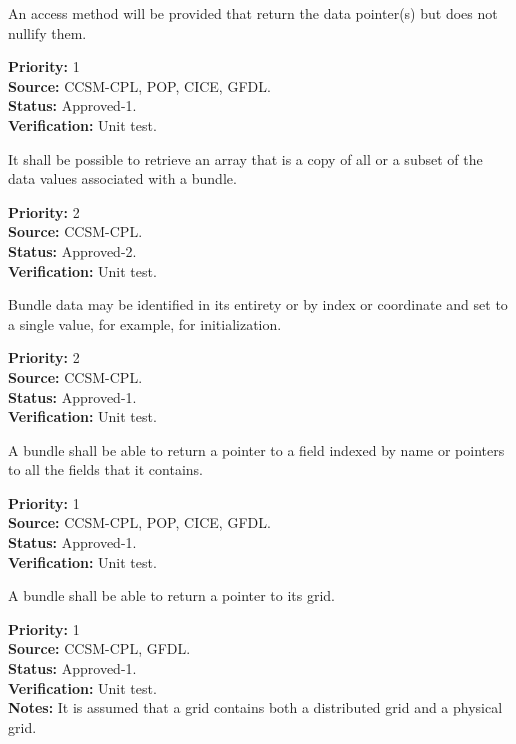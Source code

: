 An access method will be provided that return the data pointer(s) but does
not nullify them.
\begin{reqlist}
{\bf Priority:} 1\\
{\bf Source:} CCSM-CPL, POP, CICE, GFDL. \\ 
{\bf Status:} Approved-1. \\
{\bf Verification:} Unit test. 
\end{reqlist}

It shall be possible to retrieve an array that is a copy of all or
a subset of the data values associated with a bundle.
\begin{reqlist}
{\bf Priority:} 2 \\
{\bf Source:} CCSM-CPL. \\
{\bf Status:} Approved-2. \\
{\bf Verification:} Unit test. 
\end{reqlist}

Bundle data may be identified in its entirety or by index or coordinate and
set to a single value, for example, for initialization.
\begin{reqlist}
{\bf Priority:} 2 \\
{\bf Source:} CCSM-CPL. \\
{\bf Status:} Approved-1. \\
{\bf Verification:} Unit test. \\
\end{reqlist}

A bundle shall be able to return a pointer to a field indexed by name
or pointers to all the fields that it contains.
\begin{reqlist}
{\bf Priority:} 1\\
{\bf Source:} CCSM-CPL, POP, CICE, GFDL. \\
{\bf Status:} Approved-1. \\
{\bf Verification:} Unit test. 
\end{reqlist}

A bundle shall be able to return a pointer to its grid.
\begin{reqlist}
{\bf Priority:} 1\\
{\bf Source:} CCSM-CPL, GFDL. \\
{\bf Status:} Approved-1. \\
{\bf Verification:} Unit test. \\
{\bf Notes:} It is assumed that a grid contains both a distributed grid and
a physical grid.
\end{reqlist}

